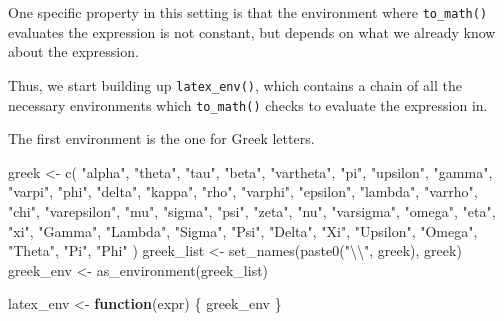 \documentclass[
]{krantz}
\makeatletter
\newenvironment{Shaded}{\begin{snugshade}}{\end{snugshade}}
\newcommand{\CharTok}[1]{\textcolor[rgb]{0.31,0.60,0.02}{#1}}
\newcommand{\ControlFlowTok}[1]{\textcolor[rgb]{0.13,0.29,0.53}{\textbf{#1}}}
\newcommand{\KeywordTok}[1]{\textcolor[rgb]{0.13,0.29,0.53}{\textbf{#1}}}
\newcommand{\NormalTok}[1]{#1}
\newcommand{\StringTok}[1]{\textcolor[rgb]{0.31,0.60,0.02}{#1}}
\newenvironment{kframe}{%
\medskip{}
\setlength{\fboxsep}{.8em}
 \def\at@end@of@kframe{}%
 \ifinner\ifhmode%
  \def\at@end@of@kframe{\end{minipage}}%
  \begin{minipage}{\columnwidth}%
 \fi\fi%
 \def\FrameCommand##1{\hskip\@totalleftmargin \hskip-\fboxsep
 \colorbox{shadecolor}{##1}\hskip-\fboxsep
     \hskip-\linewidth \hskip-\@totalleftmargin \hskip\columnwidth}%
 \MakeFramed {\advance\hsize-\width
   \@totalleftmargin\z@ \linewidth\hsize
   \@setminipage}}%
 {\par\unskip\endMakeFramed%
 \at@end@of@kframe}
\renewenvironment{Shaded}{\begin{kframe}}{\end{kframe}}
\renewcommand{\KeywordTok} [1]{\textcolor[rgb]{0.00,0.44,0.13}{{#1}}}
\renewcommand{\CharTok}    [1]{\textcolor[rgb]{0.25,0.44,0.63}{{#1}}}
\renewcommand{\StringTok}  [1]{\textcolor[rgb]{0.25,0.44,0.63}{{#1}}}
\renewcommand{\NormalTok}  [1]{{#1}}
\makeatother
\begin{document}
One specific property in this setting is that the environment where \texttt{to\_math()} evaluates the expression is not constant, but depends on what we already know about the expression.

Thus, we start building up \texttt{latex\_env()}, which contains a chain of all the necessary environments which \texttt{to\_math()} checks to evaluate the expression in.

The first environment is the one for Greek letters.

\begin{Shaded}
\begin{Highlighting}[]
\NormalTok{greek <-}\StringTok{ }\KeywordTok{c}\NormalTok{(}
  \StringTok{"alpha"}\NormalTok{, }\StringTok{"theta"}\NormalTok{, }\StringTok{"tau"}\NormalTok{, }\StringTok{"beta"}\NormalTok{, }\StringTok{"vartheta"}\NormalTok{, }\StringTok{"pi"}\NormalTok{, }\StringTok{"upsilon"}\NormalTok{,}
  \StringTok{"gamma"}\NormalTok{, }\StringTok{"varpi"}\NormalTok{, }\StringTok{"phi"}\NormalTok{, }\StringTok{"delta"}\NormalTok{, }\StringTok{"kappa"}\NormalTok{, }\StringTok{"rho"}\NormalTok{,}
  \StringTok{"varphi"}\NormalTok{, }\StringTok{"epsilon"}\NormalTok{, }\StringTok{"lambda"}\NormalTok{, }\StringTok{"varrho"}\NormalTok{, }\StringTok{"chi"}\NormalTok{, }\StringTok{"varepsilon"}\NormalTok{,}
  \StringTok{"mu"}\NormalTok{, }\StringTok{"sigma"}\NormalTok{, }\StringTok{"psi"}\NormalTok{, }\StringTok{"zeta"}\NormalTok{, }\StringTok{"nu"}\NormalTok{, }\StringTok{"varsigma"}\NormalTok{, }\StringTok{"omega"}\NormalTok{, }\StringTok{"eta"}\NormalTok{,}
  \StringTok{"xi"}\NormalTok{, }\StringTok{"Gamma"}\NormalTok{, }\StringTok{"Lambda"}\NormalTok{, }\StringTok{"Sigma"}\NormalTok{, }\StringTok{"Psi"}\NormalTok{, }\StringTok{"Delta"}\NormalTok{, }\StringTok{"Xi"}\NormalTok{,}
  \StringTok{"Upsilon"}\NormalTok{, }\StringTok{"Omega"}\NormalTok{, }\StringTok{"Theta"}\NormalTok{, }\StringTok{"Pi"}\NormalTok{, }\StringTok{"Phi"}
\NormalTok{)}
\NormalTok{greek_list <-}\StringTok{ }\KeywordTok{set_names}\NormalTok{(}\KeywordTok{paste0}\NormalTok{(}\StringTok{"}\CharTok{\textbackslash{}\textbackslash{}}\StringTok{"}\NormalTok{, greek), greek)}
\NormalTok{greek_env <-}\StringTok{ }\KeywordTok{as_environment}\NormalTok{(greek_list)}

\NormalTok{latex_env <-}\StringTok{ }\ControlFlowTok{function}\NormalTok{(expr) \{}
\NormalTok{  greek_env}
\NormalTok{\}}
\end{Highlighting}
\end{Shaded}
\end{document}
